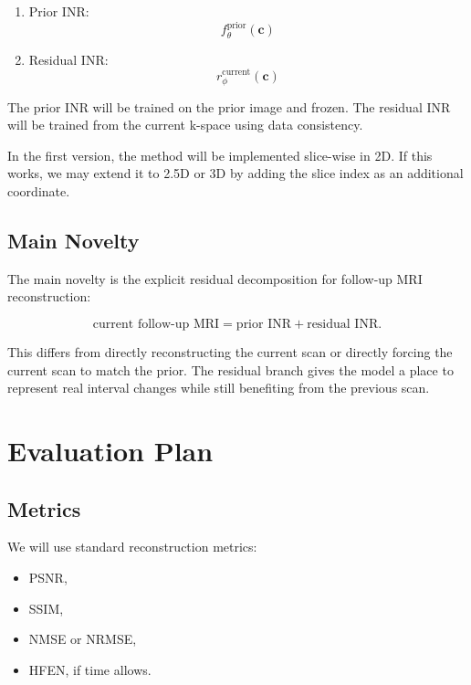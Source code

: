 \documentclass[11pt,a4paper]{article}
\begin{document}
\begin{enumerate}
    \item Prior INR:
    \begin{equation}
        f_{\theta}^{\mathrm{prior}}(\mathbf{c})
    \end{equation}

    \item Residual INR:
    \begin{equation}
        r_{\phi}^{\mathrm{current}}(\mathbf{c})
    \end{equation}
\end{enumerate}

The prior INR will be trained on the prior image and frozen. The residual INR will be trained from the current k-space using data consistency.

In the first version, the method will be implemented slice-wise in 2D. If this works, we may extend it to 2.5D or 3D by adding the slice index as an additional coordinate.

\subsection{Main Novelty}

The main novelty is the explicit residual decomposition for follow-up MRI reconstruction:

\begin{equation}
    \text{current follow-up MRI}
    =
    \text{prior INR}
    +
    \text{residual INR}.
\end{equation}

This differs from directly reconstructing the current scan or directly forcing the current scan to match the prior. The residual branch gives the model a place to represent real interval changes while still benefiting from the previous scan.

\section{Evaluation Plan}

\subsection{Metrics}

We will use standard reconstruction metrics:

\begin{itemize}
    \item PSNR,
    \item SSIM,
    \item NMSE or NRMSE,
    \item HFEN, if time allows.
\end{itemize}
\end{document}
